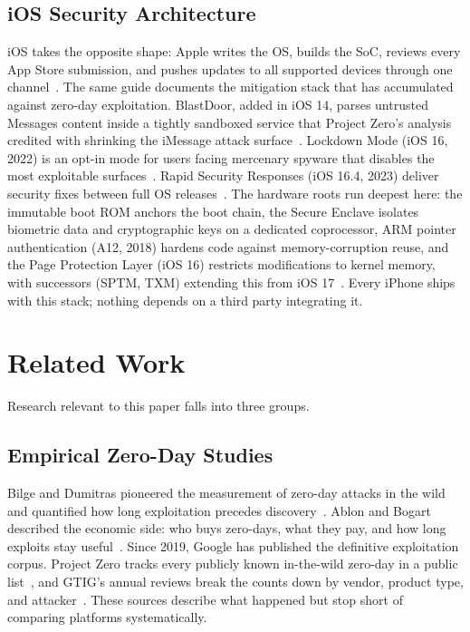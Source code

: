 \documentclass[conference,a4paper]{IEEEtran}
\begin{document}
\subsection{iOS Security Architecture}
iOS takes the opposite shape: Apple writes the OS, builds the SoC, reviews
every App Store submission, and pushes updates to all supported devices
through one channel~\cite{applesecurity2026}. The same guide documents the
mitigation stack that has accumulated against zero-day exploitation.
BlastDoor, added in iOS 14, parses untrusted Messages content inside a
tightly sandboxed service that Project Zero's analysis credited with
shrinking the iMessage attack surface~\cite{silvanovich2021imessage,
applesecurity2026}. Lockdown Mode (iOS 16, 2022) is an opt-in mode for
users facing mercenary spyware that disables the most exploitable
surfaces~\cite{lockdown2022}. Rapid Security Responses (iOS 16.4, 2023)
deliver security fixes between full OS releases~\cite{applersr2026}. The
hardware roots run deepest here: the immutable boot ROM anchors the boot
chain, the Secure Enclave isolates biometric data and cryptographic keys on
a dedicated coprocessor, ARM pointer authentication (A12, 2018) hardens
code against memory-corruption reuse, and the Page Protection Layer
(iOS 16) restricts modifications to kernel memory, with successors (SPTM,
TXM) extending this from iOS 17~\cite{applesecurity2026}. Every iPhone
ships with this stack; nothing depends on a third party integrating it.

\section{Related Work}

Research relevant to this paper falls into three groups.

\subsection{Empirical Zero-Day Studies}
Bilge and Dumitras pioneered the measurement of zero-day attacks in the
wild and quantified how long exploitation precedes
discovery~\cite{bilge2012before}. Ablon and Bogart described the economic
side: who buys zero-days, what they pay, and how long exploits stay
useful~\cite{ablon2017zero}. Since 2019, Google has published the
definitive exploitation corpus. Project Zero tracks every publicly known
in-the-wild zero-day in a public list~\cite{p0tracker}, and GTIG's annual
reviews break the counts down by vendor, product type, and
attacker~\cite{gtig2023review, charrier2025zeroday, gtig2026review}. These
sources describe what happened but stop short of comparing platforms
systematically.
\end{document}
